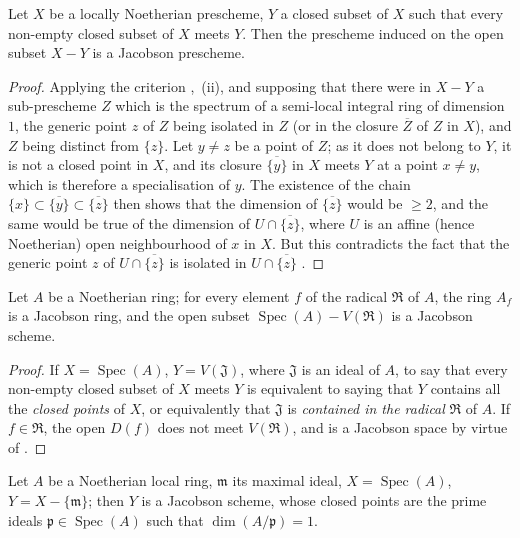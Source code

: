 \begin{proposition}[10.5.7]
\label{IV.10.5.7}
Let $X$ be a locally Noetherian prescheme, $Y$ a closed subset of $X$ such that every non-empty closed subset of $X$ meets $Y$.
Then the prescheme induced on the open subset $X-Y$ is a Jacobson prescheme.
\end{proposition}

\begin{proof}
Applying the criterion ,~(ii), and supposing that there were in $X-Y$ a sub-prescheme $Z$ which is the spectrum of a semi-local integral ring of dimension $1$, the generic point $z$ of $Z$ being isolated in $Z$ (or in the closure $\overline{Z}$ of $Z$ in $X$), and $Z$ being distinct from $\{z\}$.
Let $y\neq z$ be a point of $Z$; as it does not belong to $Y$, it is not a closed point in $X$, and its closure $\overline{\{y\}}$ in $X$ meets $Y$ at a point $x\neq y$, which is therefore a specialisation of $y$.
The existence of the chain $\{x\}\subset\overline{\{y\}}\subset\overline{\{z\}}$ then shows that the dimension of $\overline{\{z\}}$ would be $\geq 2$, and the same would be true of the dimension of $U\cap\overline{\{z\}}$, where $U$ is an affine (hence Noetherian) open neighbourhood of $x$ in $X$.
But this contradicts the fact that the generic point $z$ of $U\cap\overline{\{z\}}$ is isolated in $U\cap\overline{\{z\}}$ .
\end{proof}

\begin{corollary}[10.5.8]
\label{IV.10.5.8}
Let $A$ be a Noetherian ring; for every element $f$ of the radical $\mathfrak{R}$ of $A$, the ring $A_f$ is a Jacobson ring, and the open subset $\operatorname{Spec}(A)-V(\mathfrak{R})$ is a Jacobson scheme.
\end{corollary}

\begin{proof}
If $X=\operatorname{Spec}(A)$, $Y=V(\mathfrak{J})$, where $\mathfrak{J}$ is an ideal of $A$, to say that every non-empty closed subset of $X$ meets $Y$ is equivalent  to saying that $Y$ contains all the \emph{closed points} of $X$, or equivalently that $\mathfrak{J}$ is \emph{contained in the radical} $\mathfrak{R}$ of $A$.
If $f\in\mathfrak{R}$, the open $D(f)$ does not meet $V(\mathfrak{R})$, and is a Jacobson space by virtue of .
\end{proof}

\begin{corollary}[10.5.9]
\label{IV.10.5.9}
Let $A$ be a Noetherian local ring, $\mathfrak{m}$ its maximal ideal, $X=\operatorname{Spec}(A)$, $Y=X-\{\mathfrak{m}\}$; then $Y$ is a Jacobson scheme, whose closed points are the prime ideals $\mathfrak{p}\in\operatorname{Spec}(A)$ such that $\dim(A/\mathfrak{p})=1$.
\end{corollary}

